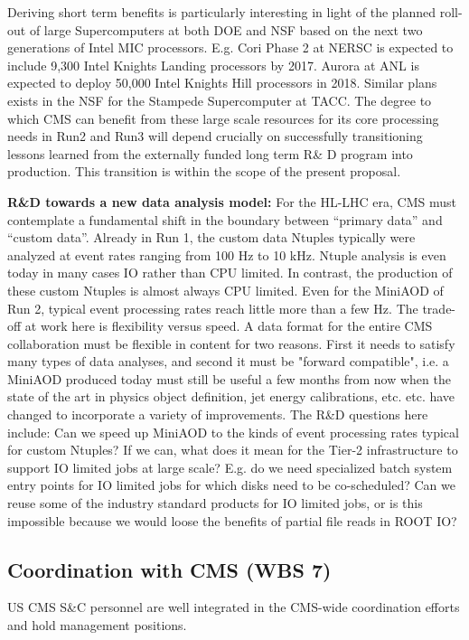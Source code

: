 \documentclass[11pt,a4paper]{article}
\begin{document}
Deriving short term benefits is particularly interesting in light of the planned roll-out of large Supercomputers at both DOE and NSF
based on the next two generations of Intel MIC processors. E.g. Cori Phase 2 at NERSC is expected to 
include 9,300 Intel Knights Landing processors by 2017. Aurora at ANL is expected to deploy 50,000 Intel Knights Hill processors in 2018.
Similar plans exists in the NSF for the Stampede Supercomputer at TACC.
The degree to which CMS can benefit from these large scale resources
for its core processing needs in Run2 and Run3 
will depend crucially on successfully transitioning lessons learned from the externally funded 
long term R\& D program into production. This transition is within the scope of the present proposal.

{\bf R\&D towards a new data analysis model:}
For the HL-LHC era, CMS must contemplate a fundamental shift in the boundary between ``primary data'' and ``custom data''.
Already in Run 1, the custom data Ntuples typically were analyzed at event rates ranging from 100 Hz to 10 kHz. 
Ntuple analysis is even today
in many cases IO rather than CPU limited. In contrast, the production of these custom Ntuples is almost always CPU limited. Even for the MiniAOD of Run 2, typical event processing rates reach little more than a few Hz.
The trade-off at work here is flexibility versus speed. A data format for the entire CMS collaboration must be flexible in content for two reasons. First it needs to satisfy many types of data analyses, and second it must be "forward compatible", i.e. a MiniAOD produced today
must still be useful a few months from now when the state of the art in physics object definition, jet energy calibrations, etc. etc. have
changed to incorporate a variety of improvements. The R\&D questions here include: Can we speed up MiniAOD to the kinds of 
event processing rates typical for custom Ntuples? If we can, what does it mean for the Tier-2 infrastructure to support IO limited
jobs at large scale? E.g. do we need specialized batch system entry points for IO limited jobs for which disks need to be co-scheduled?
Can we reuse some of the industry standard products for IO limited jobs, or is this impossible because we would loose the benefits of partial file reads in ROOT IO?


\subsection{Coordination with CMS (WBS 7)}

US CMS S\&C personnel are well integrated in the CMS-wide coordination
efforts and hold management positions.  
\end{document}
